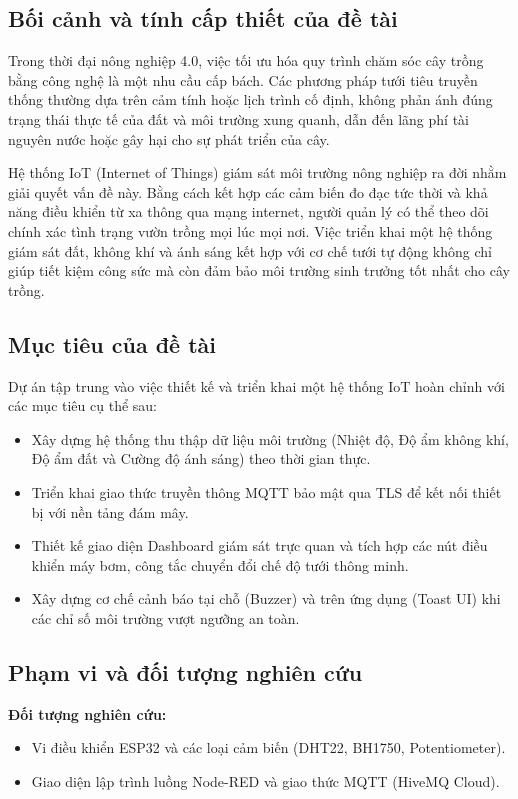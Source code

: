 \documentclass[12pt, a4paper]{article}
\begin{document}
\subsection{Bối cảnh và tính cấp thiết của đề tài}
Trong thời đại nông nghiệp 4.0, việc tối ưu hóa quy trình chăm sóc cây trồng bằng công nghệ là một nhu cầu cấp bách. Các phương pháp tưới tiêu truyền thống thường dựa trên cảm tính hoặc lịch trình cố định, không phản ánh đúng trạng thái thực tế của đất và môi trường xung quanh, dẫn đến lãng phí tài nguyên nước hoặc gây hại cho sự phát triển của cây.

Hệ thống IoT (Internet of Things) giám sát môi trường nông nghiệp ra đời nhằm giải quyết vấn đề này. Bằng cách kết hợp các cảm biến đo đạc tức thời và khả năng điều khiển từ xa thông qua mạng internet, người quản lý có thể theo dõi chính xác tình trạng vườn trồng mọi lúc mọi nơi. Việc triển khai một hệ thống giám sát đất, không khí và ánh sáng kết hợp với cơ chế tưới tự động không chỉ giúp tiết kiệm công sức mà còn đảm bảo môi trường sinh trưởng tốt nhất cho cây trồng.

\subsection{Mục tiêu của đề tài}
Dự án tập trung vào việc thiết kế và triển khai một hệ thống IoT hoàn chỉnh với các mục tiêu cụ thể sau:
\begin{itemize}
  \item Xây dựng hệ thống thu thập dữ liệu môi trường (Nhiệt độ, Độ ẩm không khí, Độ ẩm đất và Cường độ ánh sáng) theo thời gian thực.
  \item Triển khai giao thức truyền thông MQTT bảo mật qua TLS để kết nối thiết bị với nền tảng đám mây.
  \item Thiết kế giao diện Dashboard giám sát trực quan và tích hợp các nút điều khiển máy bơm, công tắc chuyển đổi chế độ tưới thông minh.
  \item Xây dựng cơ chế cảnh báo tại chỗ (Buzzer) và trên ứng dụng (Toast UI) khi các chỉ số môi trường vượt ngưỡng an toàn.
\end{itemize}

\subsection{Phạm vi và đối tượng nghiên cứu}
\textbf{Đối tượng nghiên cứu:}
\begin{itemize}
  \item Vi điều khiển ESP32 và các loại cảm biến (DHT22, BH1750, Potentiometer).
  \item Giao diện lập trình luồng Node-RED và giao thức MQTT (HiveMQ Cloud).
\end{itemize}
\end{document}
